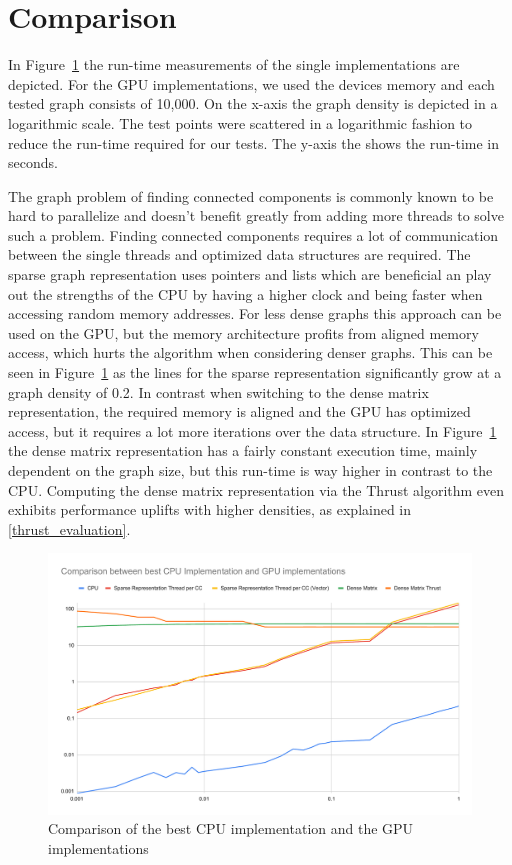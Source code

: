\documentclass[letta4 paper]{article}
\numberwithin{equation}{section}
\newcommand{\0}{\mathbf{0}}
\begin{document}
\newpage
\section{Comparison}\label{sec:compare}
In Figure~\ref{fig:impl_comparison} the run-time measurements of the single implementations are depicted. For the GPU implementations, we used the devices memory and each tested graph consists of 10,000. On the x-axis the graph density is depicted in a logarithmic scale. The test points were scattered in a logarithmic fashion to reduce the run-time required for our tests. The y-axis the shows the run-time in seconds.

The graph problem of finding connected components is commonly known to be hard to parallelize and doesn't benefit greatly from adding more threads to solve such a problem. Finding connected components requires a lot of communication between the single threads and optimized data structures are required. The sparse graph representation uses pointers and lists which are beneficial an play out the strengths of the CPU by having a higher clock and being faster when accessing random memory addresses. For less dense graphs this approach can be used on the GPU, but the memory architecture profits from aligned memory access, which hurts the algorithm when considering denser graphs. This can be seen in Figure~\ref{fig:impl_comparison} as the lines for the sparse representation significantly grow at a graph density of 0.2. In contrast when switching to the dense matrix representation, the required memory is aligned and the GPU has optimized access, but it requires a lot more iterations over the data structure. In Figure~\ref{fig:impl_comparison} the dense matrix representation has a fairly constant execution time, mainly dependent on the graph size, but this run-time is way higher in contrast to the CPU. Computing the dense matrix representation via the Thrust algorithm even exhibits performance uplifts with higher densities, as explained in \ref{thrust_evaluation}.

\begin{figure}
	\centering
	\includegraphics[width=\linewidth]{img/comparison_all.pdf}
	\caption{Comparison of the best CPU implementation and the GPU implementations}
	\label{fig:impl_comparison}
\end{figure}
\end{document}
